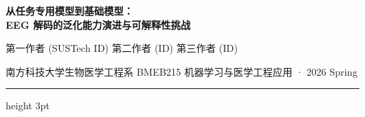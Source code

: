 \documentclass[12pt, a0paper]{article}
\begin{document}
\begin{center}
    {\fontsize{64}{76}\selectfont\bfseries\color{myblue}
        从任务专用模型到基础模型：\\[5mm]
        EEG 解码的泛化能力演进与可解释性挑战\\[12mm]
    }

    {\fontsize{32}{40}\selectfont
        第一作者 (SUSTech ID) \hspace{2em} 第二作者 (ID) \hspace{2em} 第三作者 (ID)\\[5mm]
    }

    {\fontsize{24}{32}\selectfont\color{mygray}
        南方科技大学生物医学工程系 \hspace{3em}
        BMEB215 机器学习与医学工程应用 · 2026 Spring
    }

    \vspace{8mm}
    {\color{myblue}\hrule height 3pt}
    \vspace{8mm}
\end{center}
\end{document}
